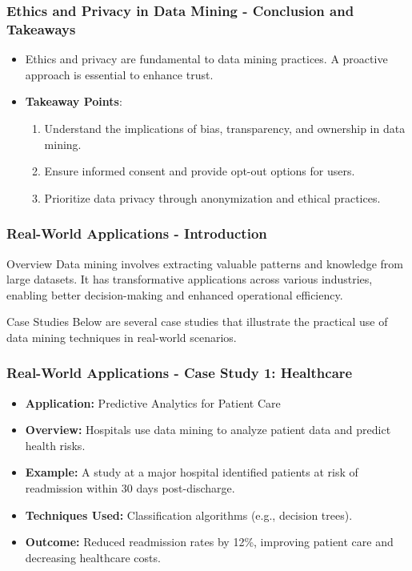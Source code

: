 \documentclass{beamer}
\begin{document}
\begin{frame}[fragile]
    \frametitle{Ethics and Privacy in Data Mining - Conclusion and Takeaways}
    \begin{itemize}
        \item Ethics and privacy are fundamental to data mining practices. A proactive approach is essential to enhance trust.
        \item \textbf{Takeaway Points}:
        \begin{enumerate}
            \item Understand the implications of bias, transparency, and ownership in data mining.
            \item Ensure informed consent and provide opt-out options for users.
            \item Prioritize data privacy through anonymization and ethical practices.
        \end{enumerate}
    \end{itemize}
\end{frame}

\begin{frame}[fragile]
    \frametitle{Real-World Applications - Introduction}
    \begin{block}{Overview}
        Data mining involves extracting valuable patterns and knowledge from large datasets. 
        It has transformative applications across various industries, enabling better 
        decision-making and enhanced operational efficiency. 
    \end{block}
    \begin{block}{Case Studies}
        Below are several case studies that illustrate the practical use of 
        data mining techniques in real-world scenarios.
    \end{block}
\end{frame}

\begin{frame}[fragile]
    \frametitle{Real-World Applications - Case Study 1: Healthcare}
    \begin{itemize}
        \item \textbf{Application:} Predictive Analytics for Patient Care
        \item \textbf{Overview:} Hospitals use data mining to analyze patient data and predict health risks.
        \item \textbf{Example:} A study at a major hospital identified patients at risk of readmission within 30 days post-discharge.
        \item \textbf{Techniques Used:} Classification algorithms (e.g., decision trees).
        \item \textbf{Outcome:} Reduced readmission rates by 12\%, improving patient care and decreasing healthcare costs.
    \end{itemize}
\end{frame}
\end{document}

